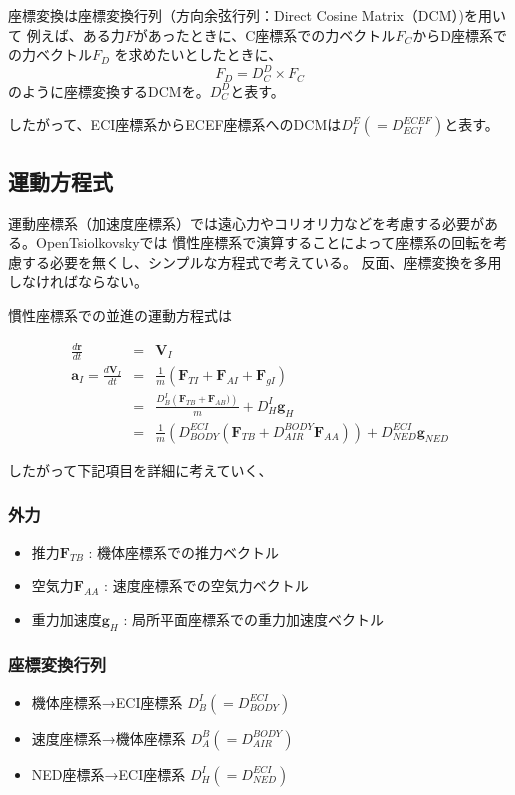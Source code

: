 \documentclass[12pt]{jsarticle}
\begin{document}
座標変換は座標変換行列（方向余弦行列：Direct Cosine Matrix（DCM）)を用いて
例えば、ある力$F$があったときに、C座標系での力ベクトル$F_C$からD座標系での力ベクトル$F_D$
を求めたいとしたときに、
\begin{equation}
  F_D = D_{C}^{D} \times F_C
\end{equation}
のように座標変換するDCMを。$D_{C}^{D}$と表す。

したがって、ECI座標系からECEF座標系へのDCMは$D_{I}^{E} (= D_{ECI}^{ECEF})$と表す。

\subsection{運動方程式}
運動座標系（加速度座標系）では遠心力やコリオリ力などを考慮する必要がある。OpenTsiolkovskyでは
慣性座標系で演算することによって座標系の回転を考慮する必要を無くし、シンプルな方程式で考えている。
反面、座標変換を多用しなければならない。

慣性座標系での並進の運動方程式は

\begin{eqnarray}
  \frac{d\bm{r}}{dt} &=& \bm{V}_{I} \\
  \bm{a}_{I} = \frac{d\bm{V}_{I}}{dt} &=& \frac{1}{m}
  \left( \bm{F}_{TI} + \bm{F}_{AI} + \bm{F}_{gI}\right) \\
  &=& \frac{D^{I}_{B} \left( \bm{F}_{TB} + \bm{F}_{AB})
   \right)}{m} + D_{H}^{I} \bm{g}_H \\
  &=& \frac{1}{m} \left( D_{BODY}^{ECI} \left( \bm{F}_{TB} +
    D_{AIR}^{BODY} \bm{F}_{AA} \right) \right) + D_{NED}^{ECI} \bm{g}_{NED}
\end{eqnarray}

したがって下記項目を詳細に考えていく、

\subsubsection{外力}
\begin{itemize}
  \item 推力$\bm{F}_{TB}$ : 機体座標系での推力ベクトル
  \item 空気力$\bm{F}_{AA}$ : 速度座標系での空気力ベクトル
  \item 重力加速度$\bm{g}_{H}$ : 局所平面座標系での重力加速度ベクトル
\end{itemize}

\subsubsection{座標変換行列}
\begin{itemize}
  \item 機体座標系→ECI座標系 $D_{B}^{I} (= D_{BODY}^{ECI})$
  \item 速度座標系→機体座標系 $D_{A}^{B} (= D_{AIR}^{BODY})$
  \item NED座標系→ECI座標系 $D_{H}^{I} (= D_{NED}^{ECI})$
\end{itemize}
\end{document}
